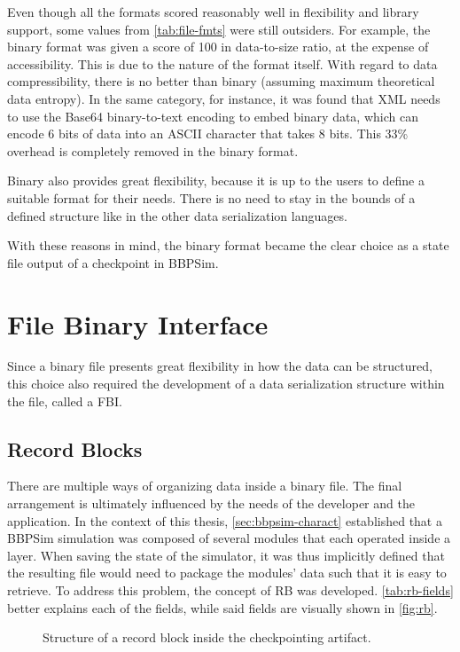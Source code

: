 {Even though all the formats scored reasonably well in flexibility and library support, some values from \autoref{tab:file-fmts} were still outsiders. For example, the binary format was given a score of 100 in data-to-size ratio, at the expense of accessibility. This is due to the nature of the format itself. With regard to data compressibility, there is no better than binary (assuming maximum theoretical data entropy\cite{art:shannon}). In the same category, for instance, it was found that XML needs to use the Base64 binary-to-text encoding to embed binary data, which can encode 6 bits of data into an \gls{ASCII} character that takes 8 bits\cite{art:base64}. This 33\% overhead is completely removed in the binary format. 

Binary also provides great flexibility, because it is up to the users to define a suitable format for their needs. There is no need to stay in the bounds of a defined structure like in the other data serialization languages.

With these reasons in mind, the binary format became the clear choice as a state file output of a checkpoint in BBPSim.

\section{File Binary Interface}
Since a binary file presents great flexibility in how the data can be structured, this choice also required the development of a data serialization structure within the file, called a \gls{FBI}.

\subsection*{Record Blocks}
There are multiple ways of organizing data inside a binary file. The final arrangement is ultimately influenced by the needs of the developer and the application. In the context of this thesis, \autoref{sec:bbpsim-charact} established that a BBPSim simulation was composed of several modules that each operated inside a layer. When saving the state of the simulator, it was thus implicitly defined that the resulting file would need to package the modules' data such that it is easy to retrieve. To address this problem, the concept of \gls{RB} was developed. \autoref{tab:rb-fields} better explains each of the fields, while said fields are visually shown in \autoref{fig:rb}.

\begin{figure}[h]
	\vspace{6pt}
	\small
	\centering
	
	\caption{Structure of a record block inside the checkpointing artifact.}
	\label{fig:rb}
\end{figure}

}
